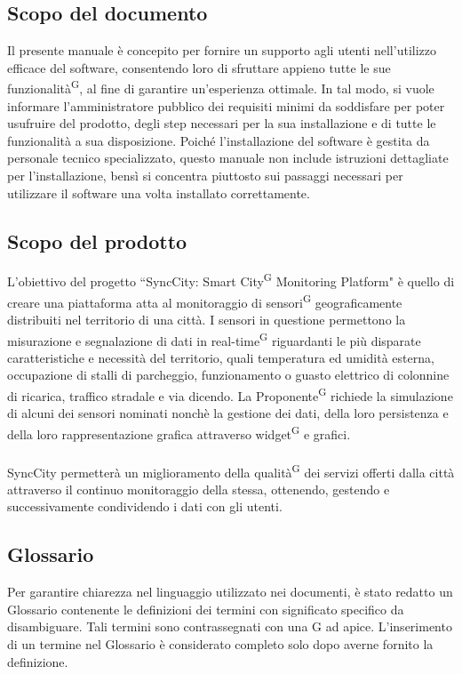 \documentclass[8pt]{article}
\newcommand{\glossterm}[1]{#1\textsuperscript{G}} %
\begin{document}
\subsection{Scopo del documento}
Il presente manuale è concepito per fornire un supporto agli utenti nell’utilizzo efficace del software, 
consentendo loro di sfruttare appieno tutte le sue \glossterm{funzionalità}, al fine di garantire un’esperienza ottimale.
In tal modo, si vuole informare l’amministratore pubblico dei requisiti minimi da soddisfare per
poter usufruire del prodotto, degli step necessari per la sua installazione e di tutte le funzionalità a sua disposizione.
 Poiché l’installazione del software è gestita da personale tecnico specializzato, questo
 manuale non include istruzioni dettagliate per l’installazione, bensì si concentra piuttosto sui
 passaggi necessari per utilizzare il software una volta installato correttamente.
\subsection{Scopo del prodotto}
L'obiettivo del progetto ``SyncCity: \glossterm{Smart City} Monitoring Platform" è quello di creare una piattaforma atta al monitoraggio
di \glossterm{sensori} geograficamente distribuiti nel territorio di una città. I sensori in questione
permettono la misurazione e segnalazione di dati in \glossterm{real-time} riguardanti le più disparate
caratteristiche e necessità del territorio, quali temperatura ed umidità esterna, occupazione di
stalli di parcheggio, funzionamento o guasto elettrico di colonnine di ricarica, traffico stradale e via
dicendo. La \glossterm{Proponente} richiede la simulazione di alcuni dei sensori nominati nonchè la
gestione dei dati, della loro persistenza e della loro rappresentazione grafica attraverso \glossterm{widget} e
grafici. 
\\\\SyncCity permetterà un miglioramento della \glossterm{qualità} dei servizi offerti dalla città attraverso il continuo monitoraggio della stessa, ottenendo, gestendo e successivamente condividendo i dati con gli utenti. 
\subsection{Glossario}
Per garantire chiarezza nel linguaggio utilizzato nei documenti, è stato redatto un Glossario contenente le definizioni dei termini con significato specifico da disambiguare. Tali termini sono contrassegnati con una G ad apice. L'inserimento di un termine nel Glossario è considerato completo solo dopo averne fornito la definizione.
\end{document}
